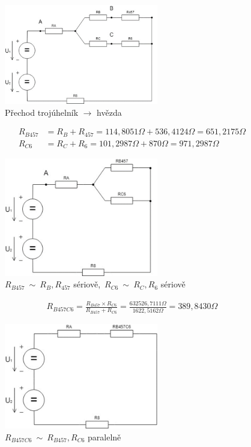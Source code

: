 \begin{figure}[H]
    \centering
    \includegraphics[width=0.6\textwidth]{fig/Pr1_3.png}
    \caption{Přechod trojúhelník $\rightarrow$ hvězda }
\end{figure}

\begin{align*}
R_{B457} &= R_B + R_{457} = 114,8051\Omega + 536,4124\Omega = 651,2175\Omega\\
R_{C6} &= R_C + R_6 = 101,2987\Omega + 870\Omega = 971,2987\Omega
\end{align*}

\begin{figure}[H]
    \centering
    \includegraphics[width=0.6\textwidth]{fig/Pr1_4.png}
    \caption{$R_{B457}~\sim~R_B,R_{457}$ sériově,~$R_{C6}~\sim~R_C,R_6$ sériově}
\end{figure}

\begin{align*}
R_{B457C6} = \frac {R_{B457} \times R_{C6}} {R_{B457} + R_{C6}} = \frac {632 526,7111\Omega} {1 622,5162\Omega} = 389,8430\Omega
\end{align*}

\begin{figure}[H]
    \centering
    \includegraphics[width=0.6\textwidth]{fig/Pr1_5.png}
    \caption{$R_{B457C6}~\sim~R_{B457},R_{C6}$ paralelně}
\end{figure}

